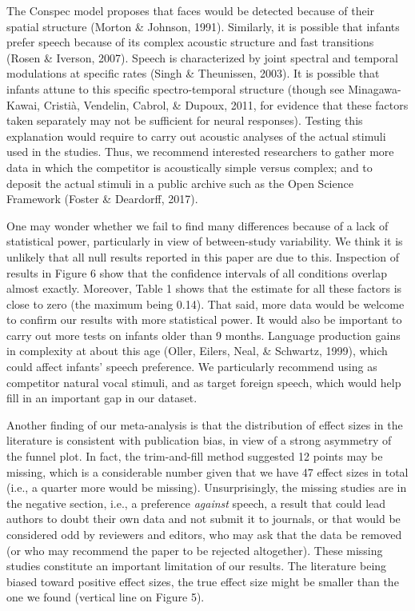 \documentclass[man]{apa6}
\begin{document}
The Conspec model proposes that faces would be detected because of their
spatial structure (Morton \& Johnson, 1991). Similarly, it is possible
that infants prefer speech because of its complex acoustic structure and
fast transitions (Rosen \& Iverson, 2007). Speech is characterized by
joint spectral and temporal modulations at specific rates (Singh \&
Theunissen, 2003). It is possible that infants attune to this specific
spectro-temporal structure (though see Minagawa-Kawai, Cristià,
Vendelin, Cabrol, \& Dupoux, 2011, for evidence that these factors taken
separately may not be sufficient for neural responses). Testing this
explanation would require to carry out acoustic analyses of the actual
stimuli used in the studies. Thus, we recommend interested researchers
to gather more data in which the competitor is acoustically simple
versus complex; and to deposit the actual stimuli in a public archive
such as the Open Science Framework (Foster \& Deardorff, 2017).

One may wonder whether we fail to find many differences because of a
lack of statistical power, particularly in view of between-study
variability. We think it is unlikely that all null results reported in
this paper are due to this. Inspection of results in Figure 6 show that
the confidence intervals of all conditions overlap almost exactly.
Moreover, Table 1 shows that the estimate for all these factors is close
to zero (the maximum being 0.14). That said, more data would be welcome
to confirm our results with more statistical power. It would also be
important to carry out more tests on infants older than 9 months.
Language production gains in complexity at about this age (Oller,
Eilers, Neal, \& Schwartz, 1999), which could affect infants' speech
preference. We particularly recommend using as competitor natural vocal
stimuli, and as target foreign speech, which would help fill in an
important gap in our dataset.

Another finding of our meta-analysis is that the distribution of effect
sizes in the literature is consistent with publication bias, in view of
a strong asymmetry of the funnel plot. In fact, the trim-and-fill method
suggested 12 points may be missing, which is a considerable number given
that we have 47 effect sizes in total (i.e., a quarter more would be
missing). Unsurprisingly, the missing studies are in the negative
section, i.e., a preference \emph{against} speech, a result that could
lead authors to doubt their own data and not submit it to journals, or
that would be considered odd by reviewers and editors, who may ask that
the data be removed (or who may recommend the paper to be rejected
altogether). These missing studies constitute an important limitation of
our results. The literature being biased toward positive effect sizes,
the true effect size might be smaller than the one we found (vertical
line on Figure 5).
\end{document}
